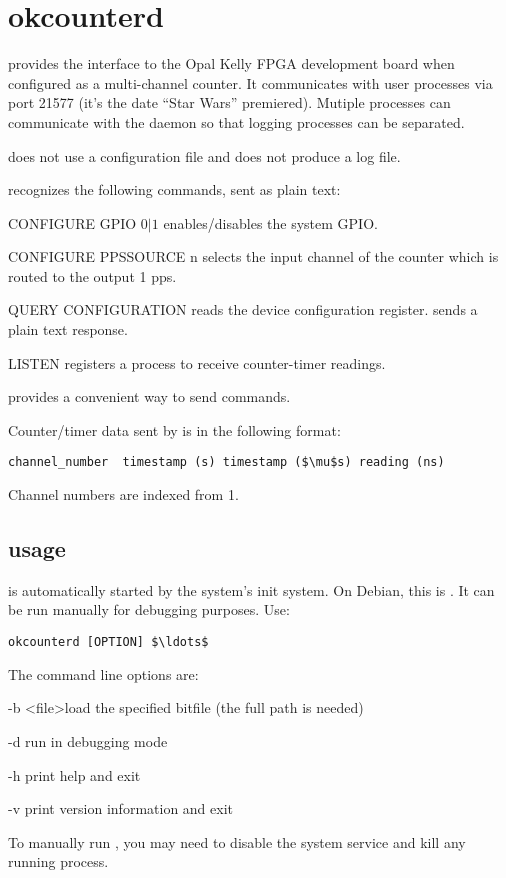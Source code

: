 
\section{okcounterd \label{sokcounterd}}

\hypertarget{h:okcounterd}{}

 provides the interface to the Opal Kelly FPGA development board when configured as a multi-channel counter.
It communicates with user processes via port 21577 (it's the date ``Star Wars'' premiered).
Mutiple processes can communicate with the daemon so that logging processes can be separated.

 does not use a configuration file and does not produce a log file.

 recognizes the following commands, sent as plain text:
\begin{description*}
	\item[] CONFIGURE GPIO $0\vert1$ enables/disables the system GPIO.
	\item[] CONFIGURE PPSSOURCE n selects the input channel of the counter which is
	routed to the output 1 pps. 
	\item[] QUERY CONFIGURATION reads the device configuration register.  sends
	a plain text response.
	\item[] LISTEN registers a process to receive counter-timer readings.
\end{description*}
 provides a convenient way to send commands.

Counter/timer data sent by  is in the following format:
\begin{lstlisting}[mathescape=true]
channel_number  timestamp (s) timestamp ($\mu$s) reading (ns)
\end{lstlisting}
Channel numbers are indexed from 1.

\subsection{usage}
 is automatically started by the system's init system. On Debian, this is . 
It can be run manually for debugging purposes. Use:
\begin{lstlisting}[mathescape=true]
okcounterd [OPTION] $\ldots$
\end{lstlisting}
The command line options are:
\begin{description*}
	\item[-b] \textless{file}\textgreater load the specified bitfile (the full path is needed)
	\item[-d]	run in debugging mode
	\item[-h]	print help and exit
	\item[-v]	print version information and exit
\end{description*}
To manually run , you may need to disable the system service
and kill any running  process.
